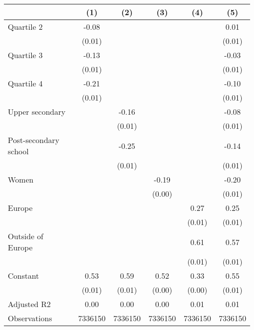 
\begin{tabular}{@{}l*{5}{S[table-format={-}2.2{\tnote{***}}]}@{}}
\toprule
{} & {(1)} & {(2)} & {(3)} & {(4)} & {(5)}\tabularnewline%
\midrule
Quartile 2 & -0.08\tnote{***} &  &  &  & 0.01\tabularnewline%
 & (0.01) &  &  &  & \vphantom{2} (0.01)\tabularnewline%
Quartile 3 & -0.13\tnote{***} &  &  &  & -0.03\tnote{***}\tabularnewline%
 & (0.01) &  &  &  & \vphantom{1} (0.01)\tabularnewline%
Quartile 4 & -0.21\tnote{***} &  &  &  & -0.10\tnote{***}\tabularnewline%
 & (0.01) &  &  &  & (0.01)\tabularnewline%
Upper secondary &  & -0.16\tnote{***} &  &  & -0.08\tnote{***}\tabularnewline%
 &  & (0.01) &  &  & \vphantom{1} (0.01)\tabularnewline%
Post-secondary school &  & -0.25\tnote{***} &  &  & -0.14\tnote{***}\tabularnewline%
 &  & (0.01) &  &  & (0.01)\tabularnewline%
Women &  &  & -0.19\tnote{***} &  & -0.20\tnote{***}\tabularnewline%
 &  &  & (0.00) &  & (0.01)\tabularnewline%
Europe &  &  &  & 0.27\tnote{***} & 0.25\tnote{***}\tabularnewline%
 &  &  &  & (0.01) & \vphantom{1} (0.01)\tabularnewline%
Outside of Europe &  &  &  & 0.61\tnote{***} & 0.57\tnote{***}\tabularnewline%
 &  &  &  & (0.01) & (0.01)\tabularnewline%
Constant & 0.53\tnote{***} & 0.59\tnote{***} & 0.52\tnote{***} & 0.33\tnote{***} & 0.55\tnote{***}\tabularnewline%
 & (0.01) & (0.01) & (0.00) & (0.00) & (0.01)\tabularnewline%
\midrule
Adjusted R2 & 0.00 & 0.00 & 0.00 & 0.01 & 0.01\tabularnewline%
Observations & {\num{7336150}} & {\num{7336150}} & {\num{7336150}} & {\num{7336150}} & {\num{7336150}}\tabularnewline%
\bottomrule
\end{tabular}
